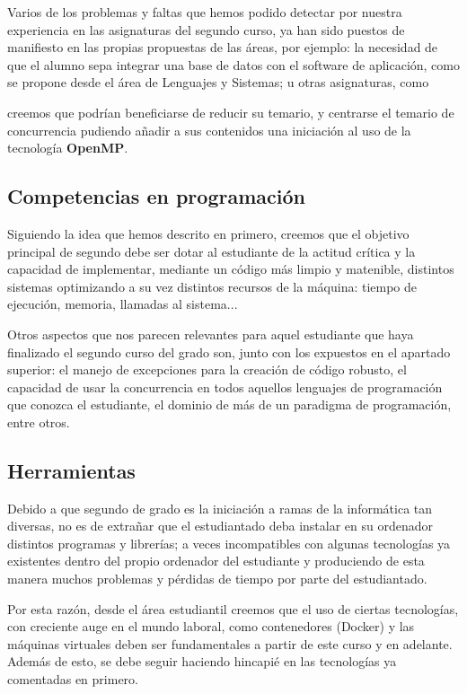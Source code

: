 Varios de los problemas y faltas que hemos podido detectar por nuestra experiencia 
en las asignaturas del segundo curso, ya han sido puestos de manifiesto en las propias propuestas 
de las áreas, por ejemplo: la necesidad de que el alumno sepa integrar una base de datos 
con el software de aplicación, como se propone desde el área de Lenguajes y Sistemas; u
otras asignaturas, como \subject{Programación Concurrente y Distribuida} creemos que podrían
beneficiarse de reducir su temario, y centrarse el temario de concurrencia pudiendo añadir a 
sus contenidos una iniciación al uso de la tecnología \textbf{OpenMP}.

\subsection{Competencias en programación}
Siguiendo la idea que hemos descrito en primero, creemos que el objetivo principal de
segundo debe ser dotar al estudiante de la actitud crítica y la capacidad de implementar, mediante
un código más limpio y matenible, distintos sistemas optimizando a su vez distintos 
recursos de la máquina: tiempo de ejecución, memoria, llamadas al sistema...

Otros aspectos que nos parecen relevantes para aquel estudiante que haya finalizado 
el segundo curso del grado son, junto con los expuestos en  el apartado superior: 
el manejo de excepciones para la creación de código robusto, el capacidad de usar la concurrencia 
en todos aquellos lenguajes de programación que conozca el estudiante, el dominio de más 
de un paradigma de programación, entre otros.

\subsection{Herramientas}
Debido a que segundo de grado es la iniciación a ramas de la informática tan diversas, 
no es de extrañar que el estudiantado deba instalar en su ordenador distintos programas y librerías;
a veces incompatibles con algunas tecnologías ya existentes dentro del propio ordenador del estudiante y 
produciendo de esta manera muchos problemas y pérdidas de tiempo por parte del estudiantado.

Por esta razón, desde el área estudiantil creemos que el uso de ciertas tecnologías, con creciente auge 
en el mundo laboral, como contenedores (Docker) y las máquinas virtuales deben ser fundamentales 
a partir de este curso y en adelante.
Además de esto, se debe seguir haciendo hincapié en las tecnologías ya comentadas en primero.

